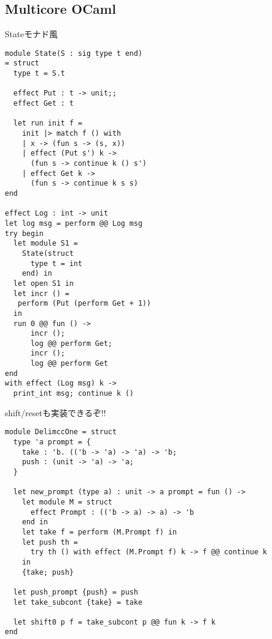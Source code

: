 \subsection{Multicore OCaml}
\begin{frame}[fragile]
    \frametitlesubs

    {\small Stateモナド風}

    \begin{multicols}{2}
        \begin{lstlisting}[basicstyle=\scriptsize\ttfamily\color{green!60!black}]
module State(S : sig type t end)
= struct
  type t = S.t

  effect Put : t -> unit;;
  effect Get : t

  let run init f =
    init |> match f () with
    | x -> (fun s -> (s, x))
    | effect (Put s') k ->
      (fun s -> continue k () s')
    | effect Get k ->
      (fun s -> continue k s s)
end

effect Log : int -> unit
let log msg = perform @@ Log msg
try begin
  let module S1 =
    State(struct
      type t = int
    end) in
  let open S1 in
  let incr () = 
   perform (Put (perform Get + 1))
  in
  run 0 @@ fun () ->
      incr ();
      log @@ perform Get;
      incr ();
      log @@ perform Get
end
with effect (Log msg) k ->
  print_int msg; continue k ()
        \end{lstlisting}
    \end{multicols}

    \vfill
\end{frame}

\hypertarget{fr:delimcc}{}
\label{fr:deimcc}
\begin{frame}[fragile]
    \frametitlesubs

    shift/resetも実装できるぞ!!
    \begin{lstlisting}[basicstyle=\scriptsize\ttfamily\color{green!60!black}]
module DelimccOne = struct
  type 'a prompt = {
    take : 'b. (('b -> 'a) -> 'a) -> 'b;
    push : (unit -> 'a) -> 'a;
  }

  let new_prompt (type a) : unit -> a prompt = fun () ->
    let module M = struct
      effect Prompt : (('b -> a) -> a) -> 'b
    end in
    let take f = perform (M.Prompt f) in
    let push th =
      try th () with effect (M.Prompt f) k -> f @@ continue k
    in
    {take; push}

  let push_prompt {push} = push
  let take_subcont {take} = take

  let shift0 p f = take_subcont p @@ fun k -> f k
end
    \end{lstlisting}
\end{frame}

